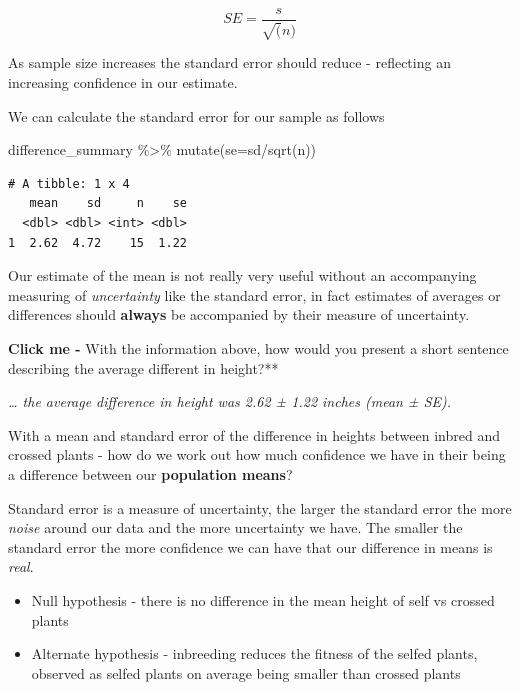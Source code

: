 \documentclass[
]{book}
\newenvironment{Shaded}{\begin{snugshade}}{\end{snugshade}}
\newcommand{\AttributeTok}[1]{\textcolor[rgb]{0.77,0.63,0.00}{#1}}
\newcommand{\FunctionTok}[1]{\textcolor[rgb]{0.00,0.00,0.00}{#1}}
\newcommand{\NormalTok}[1]{#1}
\newcommand{\SpecialCharTok}[1]{\textcolor[rgb]{0.00,0.00,0.00}{#1}}
\begin{document}
\[
SE = \frac{s}{\sqrt(n)}
\]

As sample size increases the standard error should reduce - reflecting an increasing confidence in our estimate.

We can calculate the standard error for our sample as follows

\begin{Shaded}
\begin{Highlighting}[]
\NormalTok{difference\_summary }\SpecialCharTok{\%\textgreater{}\%} 
  \FunctionTok{mutate}\NormalTok{(}\AttributeTok{se=}\NormalTok{sd}\SpecialCharTok{/}\FunctionTok{sqrt}\NormalTok{(n))}
\end{Highlighting}
\end{Shaded}

\begin{verbatim}
# A tibble: 1 x 4
   mean    sd     n    se
  <dbl> <dbl> <int> <dbl>
1  2.62  4.72    15  1.22
\end{verbatim}

Our estimate of the mean is not really very useful without an accompanying measuring of \emph{uncertainty} like the standard error, in fact estimates of averages or differences should \textbf{always} be accompanied by their measure of uncertainty.

\textbf{Click me -} With the information above, how would you present a short sentence describing the average different in height?**

\emph{\ldots{} the average difference in height was 2.62 ± 1.22 inches (mean ± SE).}

With a mean and standard error of the difference in heights between inbred and crossed plants - how do we work out how much confidence we have in their being a difference between our \textbf{population means}?

Standard error is a measure of uncertainty, the larger the standard error the more \emph{noise} around our data and the more uncertainty we have. The smaller the standard error the more confidence we can have that our difference in means is \emph{real}.

\begin{itemize}
\item
  Null hypothesis - there is no difference in the mean height of self vs crossed plants
\item
  Alternate hypothesis - inbreeding reduces the fitness of the selfed plants, observed as selfed plants on average being smaller than crossed plants
\end{itemize}
\end{document}
